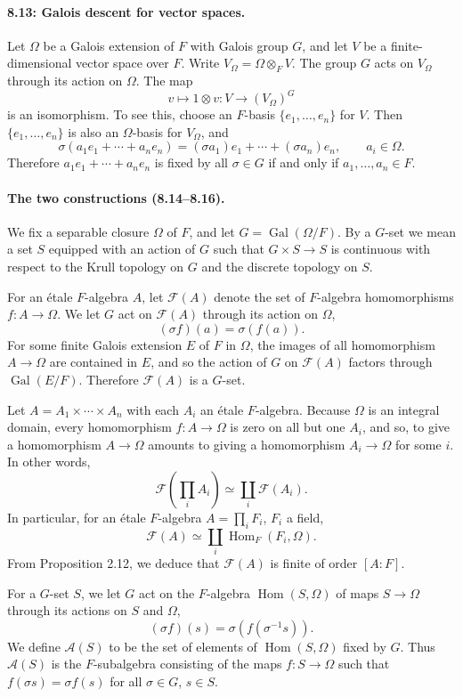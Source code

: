 \paragraph{8.13: Galois descent for vector spaces.}
Let $\Omega$ be a Galois extension of $F$ with Galois group $G$, and let $V$ be a finite-dimensional vector space over $F$. Write $V_\Omega=\Omega\otimes_F V$. The group $G$ acts on $V_\Omega$ through its action on $\Omega$. The map
\[v\longmapsto1\otimes v:V\longrightarrow (V_\Omega)^G\]
is an isomorphism. To see this, choose an $F$-basis $\{e_1,\ldots,e_n\}$ for $V$. Then $\{e_1,\ldots,e_n\}$ is also an $\Omega$-basis for $V_\Omega$, and
\[\sigma(a_1e_1+\cdots+a_ne_n)=(\sigma a_1)e_1+\cdots+(\sigma a_n)e_n,\qquad a_i\in\Omega.\]
Therefore $a_1e_1+\cdots+a_ne_n$ is fixed by all $\sigma\in G$ if and only if $a_1,\ldots,a_n\in F$.

\paragraph{The two constructions (8.14--8.16).}
We fix a separable closure $\Omega$ of $F$, and let $G=\operatorname{Gal}(\Omega/F)$. By a $G$-set we mean a set $S$ equipped with an action of $G$ such that $G\times S\to S$ is continuous with respect to the Krull topology on $G$ and the discrete topology on $S$.

For an \'etale $F$-algebra $A$, let $\mathcal F(A)$ denote the set of $F$-algebra homomorphisms $f:A\to\Omega$. We let $G$ act on $\mathcal F(A)$ through its action on $\Omega$,
\[(\sigma f)(a)=\sigma(f(a)).\]
For some finite Galois extension $E$ of $F$ in $\Omega$, the images of all homomorphism $A\to\Omega$ are contained in $E$, and so the action of $G$ on $\mathcal F(A)$ factors through $\operatorname{Gal}(E/F)$. Therefore $\mathcal F(A)$ is a $G$-set.

Let $A=A_1\times\cdots\times A_n$ with each $A_i$ an \'etale $F$-algebra. Because $\Omega$ is an integral domain, every homomorphism $f:A\to\Omega$ is zero on all but one $A_i$, and so, to give a homomorphism $A\to\Omega$ amounts to giving a homomorphism $A_i\to\Omega$ for some $i$. In other words,
\[\mathcal F\left(\prod_i A_i\right)\simeq\coprod_i\mathcal F(A_i).\]
In particular, for an \'etale $F$-algebra $A=\prod_iF_i$, $F_i$ a field,
\[\mathcal F(A)\simeq\coprod_i\operatorname{Hom}_F(F_i,\Omega).\]
From Proposition 2.12, we deduce that $\mathcal F(A)$ is finite of order $[A:F]$.

For a $G$-set $S$, we let $G$ act on the $F$-algebra $\operatorname{Hom}(S,\Omega)$ of maps $S\to\Omega$ through its actions on $S$ and $\Omega$,
\[(\sigma f)(s)=\sigma(f(\sigma^{-1}s)).\]
We define $\mathcal A(S)$ to be the set of elements of $\operatorname{Hom}(S,\Omega)$ fixed by $G$. Thus $\mathcal A(S)$ is the $F$-subalgebra consisting of the maps $f:S\to\Omega$ such that $f(\sigma s)=\sigma f(s)$ for all $\sigma\in G$, $s\in S$.

